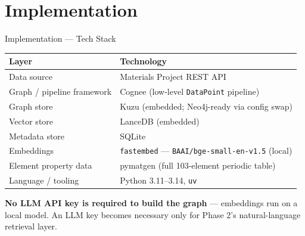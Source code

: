 \documentclass{beamer}
\begin{document}
\section{Implementation}
\begin{frame}{Implementation --- Tech Stack}
\begin{table}[h]
    \centering
    \small
    \begin{tabular}{ll}
        \toprule
        \textbf{Layer} & \textbf{Technology} \\
        \midrule
        Data source & Materials Project REST API \\
        Graph / pipeline framework & Cognee (low-level \texttt{DataPoint} pipeline) \\
        Graph store & Kuzu (embedded; Neo4j-ready via config swap) \\
        Vector store & LanceDB (embedded) \\
        Metadata store & SQLite \\
        Embeddings & \texttt{fastembed} --- \texttt{BAAI/bge-small-en-v1.5} (local) \\
        Element property data & pymatgen (full 103-element periodic table) \\
        Language / tooling & Python 3.11--3.14, \texttt{uv} \\
        \bottomrule
    \end{tabular}
\end{table}
\vspace{0.15cm}
\footnotesize
\textbf{No LLM API key is required to build the graph} --- embeddings run on a local model. An LLM key becomes necessary only for Phase 2's natural-language retrieval layer.
\end{frame}
\end{document}
